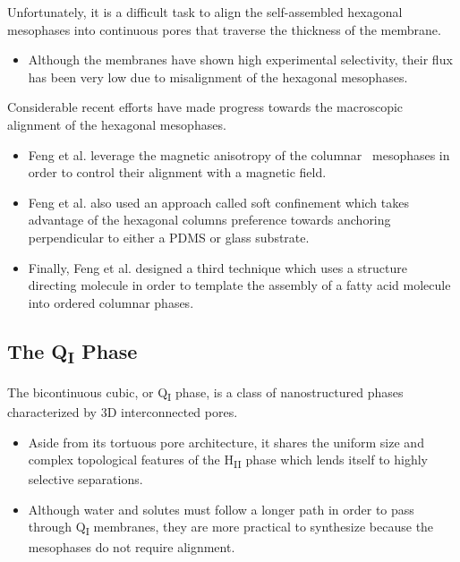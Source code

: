   Unfortunately, it is a difficult task to align the self-assembled hexagonal
  mesophases into continuous pores that traverse the thickness of the membrane.
  \begin{itemize}
    \item Although the membranes have shown high experimental selectivity, their 
    flux has been very low due to misalignment of the hexagonal mesophases.
  \end{itemize}
  
  Considerable recent efforts have made progress towards the macroscopic
  alignment of the hexagonal mesophases.
  \begin{itemize}
    \item Feng et al. leverage the magnetic anisotropy of the columnar \
    mesophases in order to control their alignment with a magnetic field.~\cite{feng_scalable_2014}
    \item Feng et al. also used an approach called soft confinement which
    takes advantage of the hexagonal columns preference towards anchoring
    perpendicular to either a PDMS or glass substrate.~\cite{feng_thin_2016}
    \item Finally, Feng et al. designed a third technique which uses a structure
    directing molecule in order to template the assembly of a fatty acid 
    molecule into ordered columnar phases.~\cite{feng_highly_2017}
  \end{itemize}
  
  \subsection{The Q\textsubscript{I} Phase}
  
  The bicontinuous cubic, or Q\textsubscript{I} phase, is a class 
  of nanostructured phases characterized by 3D interconnected pores.
  \begin{itemize}
    \item Aside from its tortuous pore architecture, it shares the 
    uniform size and complex topological features of the H\textsubscript{II} phase
    which lends itself to highly selective separations.
    \item Although water and solutes must follow a longer path in order to pass
    through Q\textsubscript{I} membranes, they are more practical to synthesize
    because the mesophases do not require alignment. 
  \end{itemize}
  
